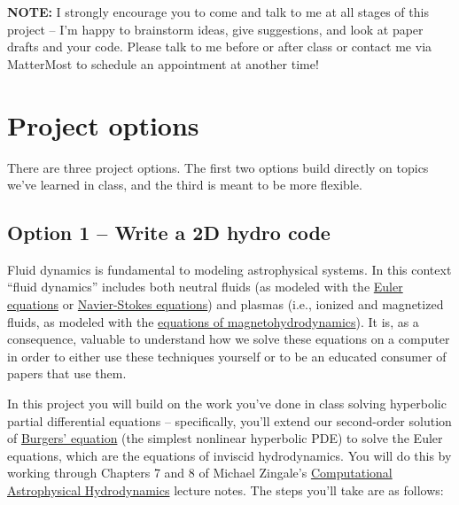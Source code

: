 \documentclass[10pt]{article}
\begin{document}
\vspace{3mm}
\noindent
\textbf{NOTE:} I strongly encourage you to come and talk to me at all
stages of this project -- I'm happy to brainstorm ideas, give
suggestions, and look at paper drafts and your code.  Please talk to
me before or after class or contact me via MatterMost to schedule an
appointment at another time!

\section{Project options}

There are three project options.  The first two options build directly
on topics we've learned in class, and the third is meant to be
more flexible.

\subsection{Option 1 -- Write a 2D hydro code}
\label{sec:hydro-option}

Fluid dynamics is fundamental to modeling astrophysical systems.  In
this context ``fluid dynamics'' includes both neutral fluids (as
modeled with the
\href{https://en.wikipedia.org/wiki/Euler_equations_(fluid_dynamics)}{Euler
  equations} or
\href{https://en.wikipedia.org/wiki/Navier%E2%80%93Stokes_equations}{Navier-Stokes
  equations}) and plasmas (i.e., ionized and magnetized fluids, as
modeled with the
\href{https://en.wikipedia.org/wiki/Magnetohydrodynamics}{equations of
  magnetohydrodynamics}).  It is, as a consequence, valuable to
understand how we solve these equations on a computer in order to
either use these techniques yourself or to be an educated consumer of
papers that use them.

In this project you will build on the work you've done in class
solving hyperbolic partial differential equations -- specifically,
you'll extend our second-order solution of
\href{https://en.wikipedia.org/wiki/Burgers%27_equation}{Burgers'
  equation} (the simplest nonlinear hyperbolic PDE) to solve the Euler
equations, which are the equations of inviscid hydrodynamics.  You
will do this by working through Chapters 7 and 8 of 
Michael Zingale's
\href{https://open-astrophysics-bookshelf.github.io/numerical_exercises/CompHydroTutorial.pdf}{Computational
  Astrophysical Hydrodynamics} lecture notes.  The steps you'll take
are as follows:
\end{document}

